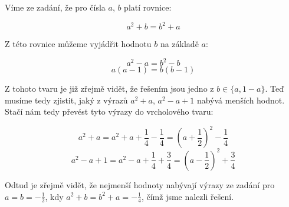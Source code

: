 \documentclass{fkssolpub}
\author{Ondřej Sedláček}
\begin{document}
Víme ze zadání, že pro čísla $a$, $b$ platí rovnice:

\[
	a^2 + b = b^2 + a
\]

Z této rovnice můžeme vyjádřit hodnotu $b$ na základě $a$:

\[
	a^2 - a = b^2 - b
\]
\[
	a (a - 1) = b (b - 1)
\]

Z tohoto tvaru je již zřejmě vidět, že řešením jsou jedno z $b \in \{a, 1 - a\}.$ Teď musíme tedy zjistit, jaký z výrazů $a^2 + a$, $a^2 - a + 1$ nabývá menších hodnot. Stačí nám tedy převést tyto výrazy do vrcholového tvaru:

\[
	a^2 + a = a^2 + a + \frac{1}{4} - \frac{1}{4} = \left(a + \frac{1}{2}\right)^2 - \frac{1}{4}
\]
\[
	a^2 - a + 1 = a^2 - a + \frac{1}{4} + \frac{3}{4} = \left(a - \frac{1}{2}\right)^2 + \frac{3}{4}
\]

Odtud je zřejmě vidět, že nejmenší hodnoty nabývají výrazy ze zadání pro $a = b = -\frac{1}{2}
$, kdy $a^2 + b = b^2 + a = -\frac{1}{4}$, čímž jsme nalezli řešení.
\end{document}
